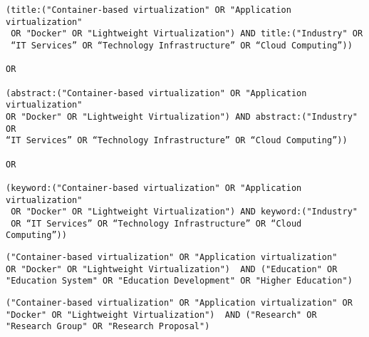 \begin{tcolorbox}[
  colback=gray!5, 
  colframe=black!60, 
  title=Cadena de búsqueda en Springer para industria, 
  fonttitle=\bfseries, 
  sharp corners=south
]
\scriptsize %
\begin{verbatim}
(title:("Container-based virtualization" OR "Application virtualization"
 OR "Docker" OR "Lightweight Virtualization") AND title:("Industry" OR 
 “IT Services” OR “Technology Infrastructure” OR “Cloud Computing”))

OR

(abstract:("Container-based virtualization" OR "Application virtualization" 
OR "Docker" OR "Lightweight Virtualization") AND abstract:("Industry" OR 
“IT Services” OR “Technology Infrastructure” OR “Cloud Computing”))

OR 

(keyword:("Container-based virtualization" OR "Application virtualization"
 OR "Docker" OR "Lightweight Virtualization") AND keyword:("Industry" 
 OR “IT Services” OR “Technology Infrastructure” OR “Cloud Computing”))

\end{verbatim}
\end{tcolorbox}

\begin{tcolorbox}[
  colback=gray!5, 
  colframe=black!60, 
  title=Cadena de búsqueda en Science Direct para educación, 
  fonttitle=\bfseries, 
  sharp corners=south
]
\scriptsize %
\begin{verbatim}
("Container-based virtualization" OR "Application virtualization" 
OR "Docker" OR "Lightweight Virtualization")  AND ("Education" OR 
"Education System" OR "Education Development" OR "Higher Education")
\end{verbatim}
\end{tcolorbox}


\begin{tcolorbox}[
  colback=gray!5, 
  colframe=black!60, 
  title=Cadena de búsqueda en Science Direct para investigación, 
  fonttitle=\bfseries, 
  sharp corners=south
]
\scriptsize %
\begin{verbatim}
("Container-based virtualization" OR "Application virtualization" OR 
"Docker" OR "Lightweight Virtualization")  AND ("Research" OR 
"Research Group" OR "Research Proposal")
\end{verbatim}
\end{tcolorbox}

